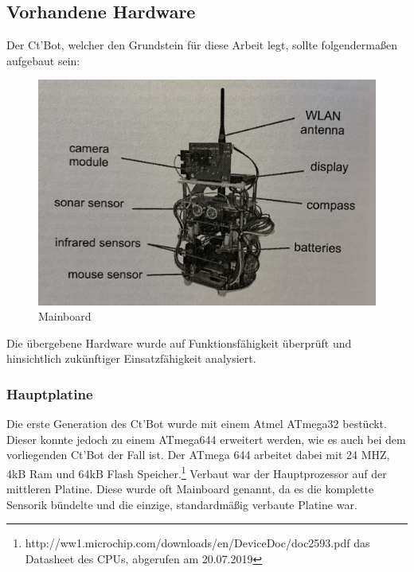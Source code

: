 \documentclass[twoside,11pt, a4paper]{report}
\begin{document}
	\subsection{Vorhandene Hardware}
	Der Ct'Bot, welcher den Grundstein für diese Arbeit legt, sollte folgendermaßen aufgebaut sein:
	
	\begin{figure}[!htb]
		\centering
		\includegraphics[scale=0.1]{images/CBot_mod.jpg}
		\caption{Mainboard}
	\end{figure}
	
	Die übergebene Hardware wurde auf Funktionsfähigkeit überprüft und hinsichtlich zukünftiger Einsatzfähigkeit analysiert. 
	
	\subsubsection{Hauptplatine}
	Die erste Generation des Ct'Bot wurde mit einem Atmel ATmega32 bestückt. Dieser konnte jedoch zu einem ATmega644 erweitert werden, wie es auch bei dem vorliegenden Ct'Bot der Fall ist. Der ATmega 644 arbeitet dabei mit 24 MHZ, 4kB Ram und 64kB Flash Speicher.\footnote{http://ww1.microchip.com/downloads/en/DeviceDoc/doc2593.pdf das Datasheet des CPUs, abgerufen am 20.07.2019} Verbaut war der Hauptprozessor auf der mittleren Platine. Diese wurde oft Mainboard genannt, da es die komplette Sensorik bündelte und die einzige, standardmäßig verbaute Platine war. 
	
\end{document}
